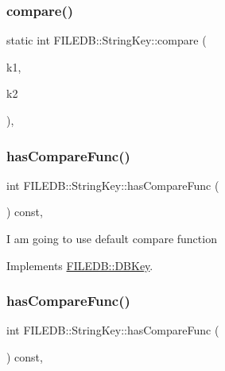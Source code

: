\subsubsection{\texorpdfstring{compare()}{compare()}\hspace{0.1cm}{\footnotesize\ttfamily [2/2]}}
{\footnotesize\ttfamily static int F\+I\+L\+E\+D\+B\+::\+String\+Key\+::compare (\begin{DoxyParamCaption}\item[{const \mbox{\hyperlink{other__libs_2filedb_2filehash_2ffdb__db_8h_aa2e0984399491df0fdd20898ca8758f9}{F\+F\+D\+B\+\_\+\+D\+BT}} $\ast$}]{k1,  }\item[{const \mbox{\hyperlink{other__libs_2filedb_2filehash_2ffdb__db_8h_aa2e0984399491df0fdd20898ca8758f9}{F\+F\+D\+B\+\_\+\+D\+BT}} $\ast$}]{k2 }\end{DoxyParamCaption})\hspace{0.3cm}{\ttfamily [inline]}, {\ttfamily [static]}}

\mbox{\label{classFILEDB_1_1StringKey_a430c4d6d22db7160c501c1703f9f13cf}} 
\subsubsection{\texorpdfstring{hasCompareFunc()}{hasCompareFunc()}\hspace{0.1cm}{\footnotesize\ttfamily [1/2]}}
{\footnotesize\ttfamily int F\+I\+L\+E\+D\+B\+::\+String\+Key\+::has\+Compare\+Func (\begin{DoxyParamCaption}\item[{void}]{ }\end{DoxyParamCaption}) const\hspace{0.3cm}{\ttfamily [inline]}, {\ttfamily [virtual]}}

I am going to use default compare function 

Implements \mbox{\hyperlink{classFILEDB_1_1DBKey_a416c32ba10caf76e6b7ff4986cfc3c05}{F\+I\+L\+E\+D\+B\+::\+D\+B\+Key}}.

\mbox{\label{classFILEDB_1_1StringKey_a430c4d6d22db7160c501c1703f9f13cf}} 
\subsubsection{\texorpdfstring{hasCompareFunc()}{hasCompareFunc()}\hspace{0.1cm}{\footnotesize\ttfamily [2/2]}}
{\footnotesize\ttfamily int F\+I\+L\+E\+D\+B\+::\+String\+Key\+::has\+Compare\+Func (\begin{DoxyParamCaption}\item[{void}]{ }\end{DoxyParamCaption}) const\hspace{0.3cm}{\ttfamily [inline]}, {\ttfamily [virtual]}}

